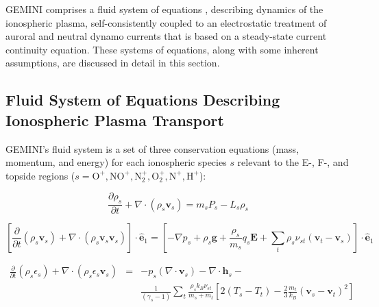 \documentclass[11pt,letterpaper]{article}
\begin{document}
GEMINI comprises a fluid system of equations \citep{Schunk:1977,Blelly:1993,Huba:2000}, describing dynamics of the ionospheric plasma, self-consistently coupled to an electrostatic treatment of auroral and neutral dynamo currents that is based on a steady-state current continuity equation.  These systems of equations, along with some inherent assumptions, are discussed in detail in this section.  


\subsection{Fluid System of Equations Describing Ionospheric Plasma Transport}

GEMINI's fluid system is a set of three conservation equations (mass, momentum, and energy) for each ionospheric species $s$ relevant to the E-, F-, and topside regions ($s=\mathrm{O^+,NO^+,N_2^+,O_2^+,N^+,H^+}$):
\begin{linenomath*} \begin{equation}
\frac{\partial \rho_s}{\partial t} + \nabla \cdot \left( \rho_s \mathbf{v}_s \right) = m_s P_s - L_s \rho_s \label{continuity}
\end{equation} \end{linenomath*}
\begin{linenomath*} \begin{equation}
\left[ \frac{\partial }{\partial t} \left( \rho_s \mathbf{v}_s \right) + \nabla \cdot \left( \rho_s \mathbf{v}_s \mathbf{v}_s \right) \right] \cdot \hat{\mathbf{e}}_1 = \left[ -\nabla p_s + \rho_s \mathbf{g} + \frac{\rho_s} {m_s} q_s \mathbf{E} + \sum_t \rho_s \nu_{st} \left(\mathbf{v}_t - \mathbf{v}_s \right) \right] \cdot \hat{\mathbf{e}}_1 \label{momentum}
\end{equation} \end{linenomath*}
\begin{linenomath*} \begin{eqnarray}
\frac{\partial}{\partial t} \left( \rho_s \epsilon_s \right) + \nabla \cdot \left( \rho_s \epsilon_s \mathbf{v}_s \right) &=& - p_s (\nabla \cdot \mathbf{v}_s) - \nabla \cdot \mathbf{h}_s - \nonumber \\
&& \frac{1}{(\gamma_s - 1 )}\sum_t \frac{\rho_s k_B \nu_{st}}{m_s + m_t}\left[ 2 (T_s-T_t) - \frac{2}{3} \frac{m_t}{k_B}(\mathbf{v}_s-\mathbf{v}_t)^2 \right] \label{energy}
\end{eqnarray} \end{linenomath*}
\end{document}
